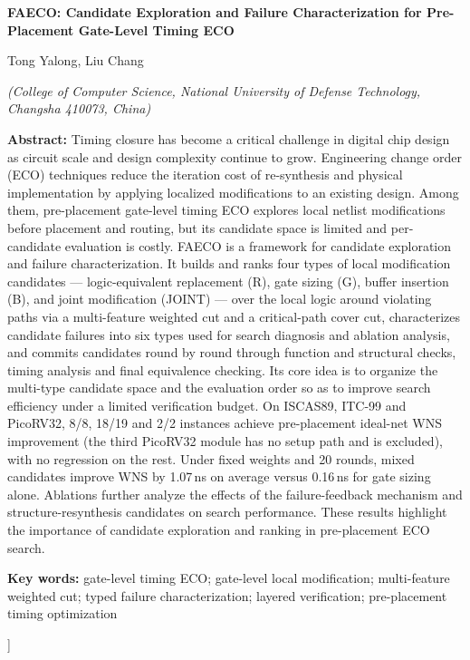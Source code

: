\documentclass[twocolumn,10pt,fontset=windows]{ctexart}
\begin{document}
\vspace{2pt}
\begin{center}
{\bfseries\fontsize{12.5}{16}\selectfont FAECO: Candidate Exploration and Failure Characterization for Pre-Placement Gate-Level Timing ECO}\par
\vspace{3pt}
{\normalsize Tong Yalong, Liu Chang\par}
\vspace{3pt}
{\small \itshape (College of Computer Science, National University of Defense Technology, Changsha 410073, China)}\par
\vspace{4pt}
\end{center}
\begin{flushleft}
  {\bfseries Abstract:} {\small Timing closure has become a critical challenge in digital chip design as circuit scale and design complexity continue to grow. Engineering change order (ECO) techniques reduce the iteration cost of re-synthesis and physical implementation by applying localized modifications to an existing design. Among them, pre-placement gate-level timing ECO explores local netlist modifications before placement and routing, but its candidate space is limited and per-candidate evaluation is costly. FAECO is a framework for candidate exploration and failure characterization. It builds and ranks four types of local modification candidates — logic-equivalent replacement (R), gate sizing (G), buffer insertion (B), and joint modification (JOINT) — over the local logic around violating paths via a multi-feature weighted cut and a critical-path cover cut, characterizes candidate failures into six types used for search diagnosis and ablation analysis, and commits candidates round by round through function and structural checks, timing analysis and final equivalence checking. Its core idea is to organize the multi-type candidate space and the evaluation order so as to improve search efficiency under a limited verification budget. On ISCAS89, ITC-99 and PicoRV32, 8/8, 18/19 and 2/2 instances achieve pre-placement ideal-net WNS improvement (the third PicoRV32 module has no setup path and is excluded), with no regression on the rest. Under fixed weights and 20 rounds, mixed candidates improve WNS by 1.07\,ns on average versus 0.16\,ns for gate sizing alone. Ablations further analyze the effects of the failure-feedback mechanism and structure-resynthesis candidates on search performance. These results highlight the importance of candidate exploration and ranking in pre-placement ECO search.}\par
\vspace{3pt}
{\bfseries Key words:} {\small gate-level timing ECO; gate-level local modification; multi-feature weighted cut; typed failure characterization; layered verification; pre-placement timing optimization}\par
\end{flushleft}
]%
\end{document}
